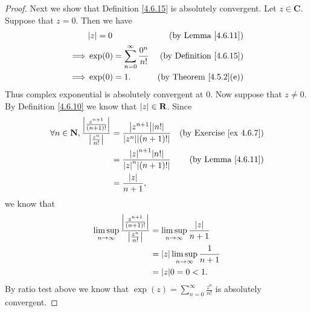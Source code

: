 \begin{proof}
    Next we show that Definition \ref{4.6.15} is absolutely convergent.
    Let \(z \in \mathbf{C}\).
    Suppose that \(z = 0\).
    Then we have
    \begin{align*}
                 & \abs*{z} = 0                                 & \text{(by Lemma \ref{4.6.11})}      \\
        \implies & \exp(0) = \sum_{n = 0}^\infty \frac{0^n}{n!} & \text{(by Definition \ref{4.6.15})} \\
        \implies & \exp(0) = 1.                                 & \text{(by Theorem \ref{4.5.2}(e))}
    \end{align*}
    Thus complex exponential is absolutely convergent at \(0\).
    Now suppose that \(z \neq 0\).
    By Definition \ref{4.6.10} we know that \(\abs*{z} \in \mathbf{R}\).
    Since
    \begin{align*}
        \forall n \in \mathbf{N}, \frac{\abs*{\frac{z^{n + 1}}{(n + 1)!}}}{\abs*{\frac{z^n}{n!}}} & = \frac{\abs*{z^{n + 1}} \abs*{n!}}{\abs*{z^n} \abs*{(n + 1)!}} & \text{(by Exercise \ref{ex 4.6.7})} \\
                                                                                                  & = \frac{\abs*{z}^{n + 1} \abs*{n!}}{\abs*{z}^n \abs*{(n + 1)!}} & \text{(by Lemma \ref{4.6.11})}      \\
                                                                                                  & = \frac{\abs*{z}}{n + 1},
    \end{align*}
    we know that
    \begin{align*}
        \limsup_{n \to \infty} \frac{\abs*{\frac{z^{n + 1}}{(n + 1)!}}}{\abs*{\frac{z^n}{n!}}} & = \limsup_{n \to \infty} \frac{\abs*{z}}{n + 1}   \\
                                                                                               & = \abs*{z} \limsup_{n \to \infty} \frac{1}{n + 1} \\
                                                                                               & = \abs*{z} 0 = 0 < 1.
    \end{align*}
    By ratio test above we know that \(\exp(z) = \sum_{n = 0}^\infty \frac{z^n}{n!}\) is absolutely convergent.


\end{proof}
